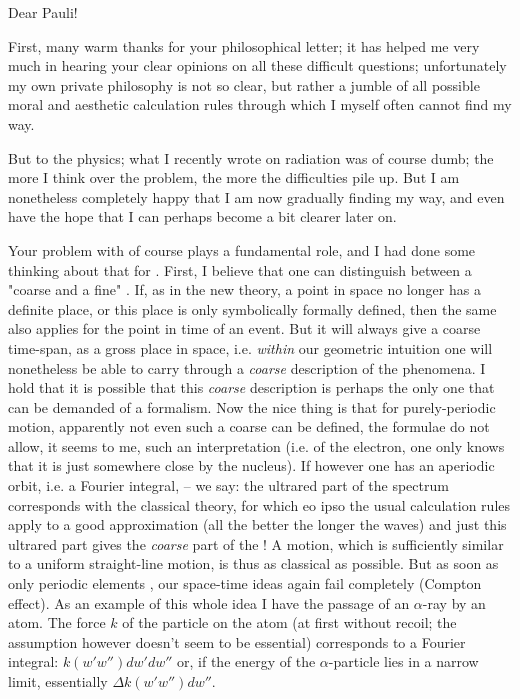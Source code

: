 \date{November 24, 1925}

Dear Pauli!

First, many warm thanks for your philosophical letter; it has helped me very much in hearing your clear opinions on all these difficult questions; unfortunately my own private philosophy is not so clear, but rather a jumble of all possible moral and aesthetic calculation rules through which I myself often cannot find my way.

But to the physics; what I recently wrote on radiation was of course dumb; the more I think over the problem, the more the difficulties pile up. But I am nonetheless completely happy that I am now gradually finding my way, and even have the hope that I can perhaps become a bit clearer later on.

Your problem with  of course plays a fundamental role, and I had done some thinking about that for . First, I believe that one can distinguish between a "coarse and a fine" . If, as in the new theory, a point in space no longer has a definite place, or this place is only symbolically formally defined, then the same also applies for the point in time of an event. But it will always give a coarse time-span, as a gross place in space, i.e. \textit{within} our geometric intuition one will nonetheless be able to carry through a \textit{coarse} description of the phenomena. I hold that it is possible that this \textit{coarse} description is perhaps the only one that can be demanded of a formalism. Now the nice thing is that for purely-periodic motion, apparently not even such a coarse  can be defined, the formulae do not allow, it seems to me, such an interpretation (i.e. of the electron, one only knows that it is just somewhere close by the nucleus). If however one has an aperiodic orbit, i.e. a Fourier integral,  -- we say: the ultrared part of the spectrum corresponds with the classical theory, for which eo ipso the usual calculation rules apply to a good approximation (all the better the longer the waves) and just this ultrared part gives the \textit{coarse} part of the ! A motion, which is sufficiently similar to a uniform straight-line motion, is thus as classical as possible. But as soon as only periodic elements , our space-time ideas again fail completely (Compton effect). As an example of this whole idea I have  the passage of an $\alpha$-ray by an atom. The force $k$ of the particle on the atom (at first without recoil; the assumption however doesn't seem to be essential) corresponds to a Fourier integral: $k(w' w''){dw}' {dw}''$ or, if the energy of the $\alpha$-particle lies in a narrow limit, essentially $\Delta k(w'w''){dw}''$.

